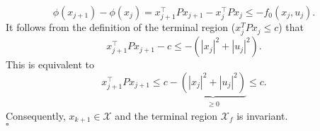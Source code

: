 \documentclass[12pt,pdftex,a4paper]{scrartcl}
\begin{document}
\begin{enumerate}
\begin{compactenum}[1.]
   \begin{equation*}
       \phi(x_{j+1})-\phi(x_j) = x_{j+1}^\top P x_{j+1} - x_j^\top P x_j \leq -f_0(x_j,u_j).
   \end{equation*}
   It follows from the definition of the terminal region ($x_j^T P x_j \leq c$) that 
   \begin{equation*}
       x_{j+1}^\top P x_{j+1} - c \leq -(|x_j|^2 + |u_j|^2).
   \end{equation*}
   This is equivalent to 
   \begin{equation*}
       x_{j+1}^\top P x_{j+1} \leq c - \underbrace{(|x_j|^2 + |u_j|^2)}_{\substack{\geq 0}} \leq c.
   \end{equation*}
   Consequently, $x_{k+1} \in \mathcal{X}$ and the terminal region $\mathcal{X}_f$ is invariant.\\
   \hspace*{133mm}$\square$
   \end{compactenum}


\end{enumerate}
\end{document}
